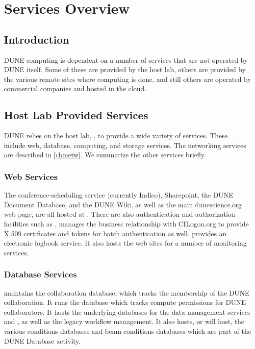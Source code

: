 \documentclass[../main-v1.tex]{subfiles}
\begin{document}
\chapter{Services Overview }
\label{ch:serv}

\section{Introduction}
DUNE computing is dependent on a number of services that are not operated by DUNE itself.
Some of these are provided by the host lab, others are provided by the various remote sites where
computing is done, and still others are operated by commercial companies and hosted in the cloud.

\section{Host Lab Provided Services}
DUNE relies on the host lab, , to provide a wide variety of services.  These include web, database, computing, and storage services.  The networking services are described in \ref{ch:netw}.  We summarize the other services briefly.

\subsection{Web Services}
The conference-scheduling service (currently Indico), Sharepoint, the DUNE Document Database, and the DUNE Wiki, as well as the main dunescience.org web page, are all hosted at .  There are also authentication and authorization facilities such as .   manages the business relationship with CILogon.org to provide X.509 certificates and   tokens for batch authentication as well.   provides an electronic logbook service.  It also hosts the web sites for a number of monitoring services. 

\subsection{Database Services}
 maintains the collaboration database, which tracks the membership of the DUNE collaboration.  It runs the  
database which tracks compute permissions for DUNE collaborators.  It hosts the underlying databases for the data management
services  and , as well as the legacy  workflow management. It also hosts, or will host, the various conditions databases and beam conditions databases which are part of the DUNE Database activity.
\end{document}
